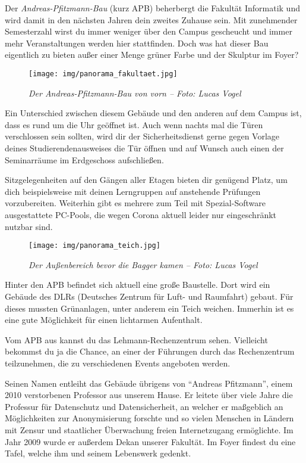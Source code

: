 
Der \emph{Andreas-Pfitzmann-Bau} (kurz APB) beherbergt die Fakultät Informatik und wird damit in den nächsten Jahren dein zweites Zuhause sein.
Mit zunehmender Semesterzahl wirst du immer weniger über den Campus gescheucht und immer mehr Veranstaltungen werden hier stattfinden.
Doch was hat dieser Bau eigentlich zu bieten außer einer Menge grüner Farbe und der Skulptur im Foyer?

\begin{figure}[h!]
    \centering
    \texttt{[image: img/panorama\_fakultaet.jpg]}
    \caption*{\small \textit{Der Andreas-Pfitzmann-Bau von vorn -- Foto: Lucas Vogel}}
\end{figure}

Ein Unterschied zwischen diesem Gebäude und den anderen auf dem Campus ist, dass es rund um die Uhr geöffnet ist. Auch wenn nachts mal die Türen verschlossen sein sollten, wird dir der Sicherheitsdienst gerne gegen Vorlage deines Studierendenausweises die Tür öffnen und auf Wunsch auch einen der Seminarräume im Erdgeschoss aufschließen.

Sitzgelegenheiten auf den Gängen aller Etagen bieten dir genügend Platz, um dich beispielsweise mit deinen Lerngruppen auf anstehende Prüfungen vorzubereiten. Weiterhin gibt es mehrere zum Teil mit Spezial-Software ausgestattete PC-Pools, die wegen Corona aktuell leider nur eingeschränkt nutzbar sind.

\label{sec:apb}

\begin{figure}[t]
    \centering
    \texttt{[image: img/panorama\_teich.jpg]}
    \caption*{\small \textit{Der Außenbereich bevor die Bagger kamen -- Foto: Lucas Vogel}}
\end{figure}

Hinter den APB befindet sich aktuell eine große Baustelle. Dort wird ein Gebäude des DLRs (Deutsches Zentrum für Luft- und Raumfahrt) gebaut. Für dieses mussten Grünanlagen, unter anderem ein Teich weichen. Immerhin ist es eine gute Möglichkeit für einen lichtarmen Aufenthalt.

Vom APB aus kannst du das Lehmann-Rechenzentrum sehen. Vielleicht bekommst du ja die Chance, an einer der Führungen durch das Rechenzentrum teilzunehmen, die zu verschiedenen Events angeboten werden.

Seinen Namen entleiht das Gebäude übrigens von \enquote{Andreas Pfitzmann}, einem 2010 verstorbenen Professor aus unserem Hause. Er leitete über viele Jahre die Professur für Datenschutz und Datensicherheit, an welcher er maßgeblich an Möglichkeiten zur Anonymisierung forschte und so vielen Menschen in Ländern mit Zensur und staatlicher Überwachung freien Internetzugang ermöglichte. Im Jahr 2009 wurde er außerdem Dekan unserer Fakultät. 
Im Foyer findest du eine Tafel, welche ihm und seinem Lebenswerk gedenkt.

